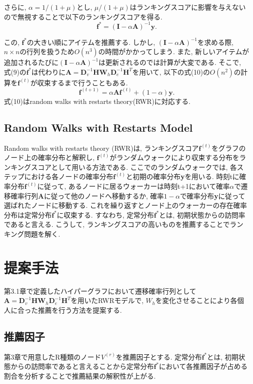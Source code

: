 \documentclass[a4j,11pt]{jarticle}           %
\begin{document}
	さらに, $\alpha=1/(1+\mu)$とし, $\mu/(1+\mu)$はランキングスコアに影響を与えないので無視することで以下のランキングスコアを得る. 
	\begin{equation}
		\textbf{f}^* = (\textbf{I}-\alpha\textbf{A})^{-1}\textbf{y}.
	\end{equation}
	
	この, $\textbf{f}^*$の大きい順にアイテムを推薦する. しかし, $(\textbf{I}-\alpha\textbf{A})^{-1}$を求める際, $n\times n$の行列を扱うため$O(n^3)$の時間がかかってしまう. また, 新しいアイテムが追加されるたびに$(\textbf{I}-\alpha\textbf{A})^{-1}$は更新されるのでは計算が大変である. 
	そこで, 式(9)の$\textbf{f}^*$は代わりに$\textbf{A}=\textbf{D}_v^{-1}\textbf{H}\textbf{W}_h\textbf{D}_e^{-1}\textbf{H}^T$を用いて, 以下の式(10)の$O(n^2)$の計算を$\textbf{f}^{(t)}$が収束するまで行うこともある. 
	\begin{equation}
		\textbf{f}^{(t+1)}=\alpha\textbf{A}\textbf{f}^{(t)}+(1-\alpha)\textbf{y}.
	\end{equation}
	式(10)はrandom walks with restarts theory(RWR)\cite{rwr}に対応する. 
	
	
	\subsection{Random Walks with Restarts Model}
	Random walks with restarts theory (RWR)\cite{rwr}は, ランキングスコア$\textbf{f}^{(t)}$をグラフのノード上の確率分布と解釈し, 
	$\textbf{f}^{(t)}$がランダムウォークにより収束する分布をランキングスコアとして用いる方法である. 
	ここでのランダムウォークでは, 各ステップにおける各ノードの確率分布$\textbf{f}^{(t)}$と初期の確率分布\textbf{y}を用いる. 時刻tに確率分布$\textbf{f}^{(t)}$に従って, あるノードに居るウォーカーは時刻t+1において確率$\alpha$で遷移確率行列\textbf{A}に従って他のノードへ移動するか, 確率$1-\alpha$で確率分布\textbf{y}に従って選ばれたノードに移動する. 
	これを繰り返すとノード上のウォーカーの存在確率分布は定常分布$\textbf{f}^*$に収束する. 
	すなわち, 定常分布$\textbf{f}^*$とは, 初期状態からの訪問率であると言える. 
	こうして, ランキングスコアの高いものを推薦することでランキング問題を解く. 
	\newpage
	\section{提案手法}
	第3.1章で定義したハイパーグラフにおいて遷移確率行列として$\textbf{A}=\textbf{D}_v^{-1}\textbf{H}\textbf{W}_h\textbf{D}_e^{-1}\textbf{H}^T$を用いたRWRモデルで, $W_h$を変化させることにより各個人に合った推薦を行う方法を提案する. 
	\subsection{推薦因子}
	第3章で用意したR種類のノード$V^{(r)}$を推薦因子とする. 定常分布$\textbf{f}^*$とは, 初期状態からの訪問率であると言えることから定常分布$\textbf{f}^*$において各推薦因子が占める割合を分析することで推薦結果の解釈性が上がる. 
	
\end{document}
